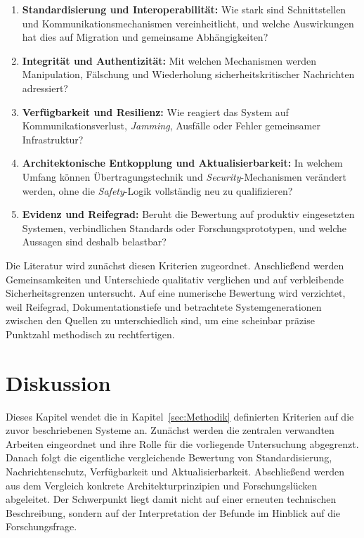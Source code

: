 \documentclass[runningheads]{res/llncs}
\begin{document}
\begin{enumerate}
    \item \textbf{Standardisierung und Interoperabilität:} Wie stark sind Schnittstellen und Kommunikationsmechanismen vereinheitlicht, und welche Auswirkungen hat dies auf Migration und gemeinsame Abhängigkeiten?
    \item \textbf{Integrität und Authentizität:} Mit welchen Mechanismen werden Manipulation, Fälschung und Wiederholung sicherheitskritischer Nachrichten adressiert?
    \item \textbf{Verfügbarkeit und Resilienz:} Wie reagiert das System auf Kommunikationsverlust, \textit{Jamming}, Ausfälle oder Fehler gemeinsamer Infrastruktur?
    \item \textbf{Architektonische Entkopplung und Aktualisierbarkeit:} In welchem Umfang können Übertragungstechnik und \textit{Security}-Mechanismen verändert werden, ohne die \textit{Safety}-Logik vollständig neu zu qualifizieren?
    \item \textbf{Evidenz und Reifegrad:} Beruht die Bewertung auf produktiv eingesetzten Systemen, verbindlichen Standards oder Forschungsprototypen, und welche Aussagen sind deshalb belastbar?
\end{enumerate}

Die Literatur wird zunächst diesen Kriterien zugeordnet. Anschließend werden Gemeinsamkeiten und Unterschiede qualitativ verglichen und auf verbleibende Sicherheitsgrenzen untersucht. Auf eine numerische Bewertung wird verzichtet, weil Reifegrad, Dokumentationstiefe und betrachtete Systemgenerationen zwischen den Quellen zu unterschiedlich sind, um eine scheinbar präzise Punktzahl methodisch zu rechtfertigen.

\section{Diskussion}
\label{sec:Diskussion}

Dieses Kapitel wendet die in Kapitel~\ref{sec:Methodik} definierten Kriterien auf die zuvor beschriebenen Systeme an. Zunächst werden die zentralen verwandten Arbeiten eingeordnet und ihre Rolle für die vorliegende Untersuchung abgegrenzt. Danach folgt die eigentliche vergleichende Bewertung von Standardisierung, Nachrichtenschutz, Verfügbarkeit und Aktualisierbarkeit. Abschließend werden aus dem Vergleich konkrete Architekturprinzipien und Forschungslücken abgeleitet. Der Schwerpunkt liegt damit nicht auf einer erneuten technischen Beschreibung, sondern auf der Interpretation der Befunde im Hinblick auf die Forschungsfrage.
\end{document}
